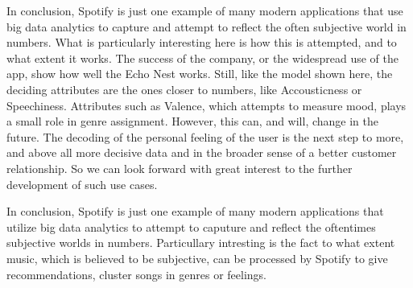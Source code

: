    In conclusion, Spotify is just one example of many modern applications that use big data analytics to capture and attempt to reflect the often subjective world in numbers. 
    What is particularly interesting here is how this is attempted, and to what extent it works. The success of the company, or the widespread use of the app, 
    show how well the Echo Nest works. Still, like the model shown here, the deciding attributes are the ones closer to numbers, like Accousticness or Speechiness. 
    Attributes such as Valence, which attempts to measure mood, plays a small role in genre assignment. However, this can, and will, change in the future. 
    The decoding of the personal feeling of the user is the next step to more, and above all more decisive data and in the broader sense of a better customer relationship. 
    So we can look forward with great interest to the further development of such use cases.

    In conclusion, Spotify is just one example of many modern applications that utilize big data analytics to attempt to caputure and reflect the oftentimes subjective worlds in numbers. 
    Particullary intresting is the fact to what extent music, which is believed to be subjective, can be processed by Spotify to give recommendations, cluster songs in genres or feelings. 



